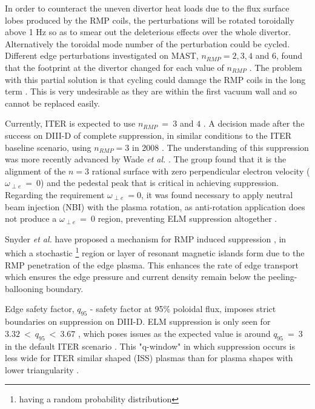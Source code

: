 \documentclass[11pt, twocolumn]{article}  %
\begin{document}
In order to counteract the uneven divertor heat loads due to the flux surface lobes produced by the RMP coils, the perturbations will be rotated toroidally above 1 Hz \cite{LoarteTR2013} so as to smear out the deleterious effects over the whole divertor. Alternatively the toroidal mode number of the perturbation could be cycled. Different edge perturbations investigated on MAST, $n_{RMP}=2,3,4$ and $6$, found that the footprint at the divertor changed for each value of $n_{RMP}$ \cite{Chapman2014}. The problem with this partial solution is that cycling could damage the RMP coils in the long term \cite{KirkFF}. This is very undesirable as they are within the first vacuum wall and so cannot be replaced easily. 

Currently, ITER is expected to use $n_{RMP}~=~3$ and $4$ \cite{Chapman2014}. A decision made after the success on DIII-D of complete suppression, in similar conditions to the ITER baseline scenario, using $n_{RMP}=3$ in 2008 \cite{Evans2008, Fenstermacher2008}. The understanding of this suppression was more recently advanced by Wade \textit{et al.} \cite{Wade2015}. The group found that it is the alignment of the $n=3$ rational surface with zero perpendicular electron velocity ($\omega_{\perp e}~=~0$) and the pedestal peak that is critical in achieving suppression. Regarding the requirement $\omega_{\perp e}~=0$, it was found necessary to apply neutral beam injection (NBI) with the plasma rotation, as anti-rotation application does not produce a $\omega_{\perp e}~=~0$ region, preventing ELM suppression altogether \cite{Wade2015}.

Snyder \textit{et al.} have proposed a mechanism for RMP induced suppression \cite{Snyder2012}, in which a stochastic \footnote{having a random probability distribution} region or layer of resonant magnetic islands form due to the RMP penetration of the edge plasma. This enhances the rate of edge transport which ensures the edge pressure and current density remain below the peeling-ballooning boundary.

Edge safety factor, $q_{95}$ - safety factor at 95\% poloidal flux, imposes strict boundaries on suppression on DIII-D. ELM suppression is only seen for $3.32~<~q_{95}~<~3.67$ \cite{Fenstermacher2008}, which poses issues as the expected value is around $q_{95}~=~3$ in the default ITER scenario \cite{Gormezano2007}. This "q-window" in which suppression occurs is less wide for ITER similar shaped (ISS) plasmas than for plasma shapes with lower triangularity \cite{Evans2008}. 
\end{document}
